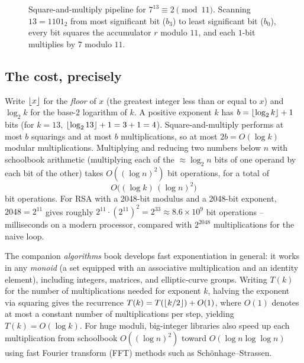 \begin{figure}[htbp]
\caption{Square-and-multiply pipeline for $7^{13} \equiv 2 \pmod{11}$. Scanning $13 = 1101_2$ from most significant bit ($b_3$) to least significant bit ($b_0$), every bit squares the accumulator $r$ modulo $11$, and each $1$-bit multiplies by $7$ modulo $11$.}
\label{ch03:sqm-diagram}
\end{figure}

\subsection{The cost, precisely}

Write $\lfloor x\rfloor$ for the \emph{floor} of $x$ (the greatest integer less than or equal to $x$) and $\log_2 k$ for the base-$2$ logarithm of $k$. A positive exponent $k$ has $b = \lfloor\log_2 k\rfloor + 1$ bits (for $k = 13$, $\lfloor\log_2 13\rfloor + 1 = 3 + 1 = 4$). Square-and-multiply performs at most $b$ squarings and at most $b$ multiplications, so at most $2b = O(\log k)$ modular multiplications. Multiplying and reducing two numbers below $n$ with schoolbook arithmetic (multiplying each of the $\approx \log_2 n$ bits of one operand by each bit of the other) takes $O((\log n)^2)$ bit operations, for a total of
\[
  O\bigl((\log k)\,(\log n)^2\bigr)
\]
bit operations. For RSA with a 2048-bit modulus and a 2048-bit exponent, $2048 = 2^{11}$ gives roughly $2^{11} \cdot (2^{11})^2 = 2^{33} \approx 8.6 \times 10^9$ bit operations -- milliseconds on a modern processor, compared with $2^{2048}$ multiplications for the naive loop.

\begin{connectionbox}
The companion \emph{algorithms} book develops fast exponentiation in general: it works in any \emph{monoid} (a set equipped with an associative multiplication and an identity element), including integers, matrices, and elliptic-curve groups. Writing $T(k)$ for the number of multiplications needed for exponent $k$, halving the exponent via squaring gives the recurrence $T(k) = T(\lfloor k/2\rfloor) + O(1)$, where $O(1)$ denotes at most a constant number of multiplications per step, yielding $T(k) = O(\log k)$. For huge moduli, big-integer libraries also speed up each multiplication from schoolbook $O((\log n)^2)$ toward $O(\log n \log\log n)$ using fast Fourier transform (FFT) methods such as Sch\"onhage--Strassen.
\end{connectionbox}

